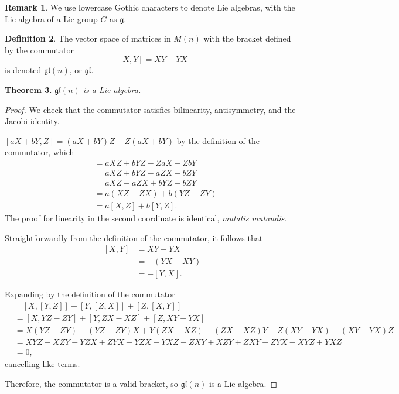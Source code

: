 \documentclass[12pt]{article}
\newcommand{\g}{\mathfrak{g}}
\newcommand{\gl}{\mathfrak{gl}}
\newtheorem{them}{Theorem}[section]
\theoremstyle{definition}
\theoremstyle{definition}
\theoremstyle{definition}
\theoremstyle{definition}
\newtheorem{rmk}[them]{Remark}
\theoremstyle{definition}
\newtheorem{defn}[them]{Definition}
\theoremstyle{definition}
\theoremstyle{definition}
\theoremstyle{definition}
\begin{document}
\begin{rmk}We use lowercase Gothic characters to
denote Lie algebras, with the Lie algebra of a Lie
group $G$ as $\g$.\end{rmk}

\begin{defn} The vector space of matrices in
$M(n)$ with the bracket defined by the commutator 
\[
    [X, Y] = XY - YX
\] is denoted $\gl(n)$, or $\gl$.
\end{defn}

\begin{them}$\gl(n)$ is a Lie algebra.\end{them}
\begin{proof}
\par{We check that the commutator satisfies
bilinearity, antisymmetry, and the Jacobi
identity.}
\par{$[aX + bY, Z] = (aX + bY)Z - Z(aX + bY)$ by
the definition of the commutator, which 
\[\begin{aligned}& = aXZ + bYZ - ZaX - ZbY \\
& = aXZ + bYZ - aZX - bZY \\
& = aXZ - aZX + bYZ - bZY \\
& = a(XZ - ZX) + b(YZ - ZY) \\
& = a[X, Z] + b[Y, Z].\end{aligned}\] The proof for linearity
in the second coordinate is identical,
\textit{mutatis mutandis}.}
\par{Straightforwardly from the definition of the
commutator, it follows that
\[\begin{aligned}
    [X, Y] & = XY - YX \\ & = -(YX - XY) \\ & = -[Y,X].
\end{aligned}\]}
\par{Expanding by the definition of the
commutator 
\[\begin{aligned} 
&\quad [X, [Y, Z]] + [Y, [Z,
X]] + [Z, [X, Y]] \\ 
& = [X, YZ - ZY] + [Y, ZX - XZ] +
[Z, XY - YX] \\
& = X(YZ - ZY) - (YZ-ZY)X + Y(ZX-XZ) - (ZX-XZ)Y +
Z(XY-YX) - (XY-YX)Z \\
& = XYZ - XZY - YZX + ZYX + YZX - YXZ - ZXY + XZY
+ ZXY - ZYX - XYZ + YXZ \\
& = 0,\end{aligned}\] cancelling like terms.}
\par{Therefore, the commutator is a valid bracket,
so $\gl(n)$ is a Lie algebra.}
\end{proof}
\end{document}
